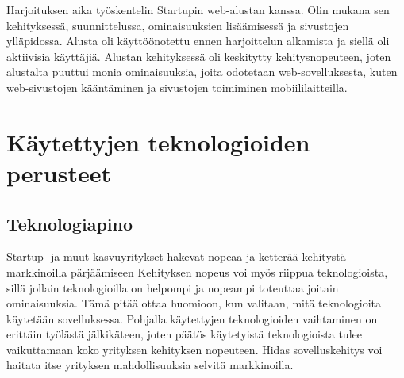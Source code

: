 \documentclass[11pt,a4paper,titlepage,oneside]{article}
\begin{document}
Harjoituksen aika työskentelin Startupin web-alustan kanssa. 
Olin mukana sen kehityksessä, suunnittelussa, ominaisuuksien lisäämisessä ja sivustojen ylläpidossa.
Alusta oli käyttöönotettu ennen harjoittelun alkamista ja siellä oli aktiivisia käyttäjiä.
Alustan kehityksessä oli keskitytty kehitysnopeuteen,
joten alustalta puuttui monia ominaisuuksia, joita odotetaan web-sovelluksesta, 
kuten web-sivustojen kääntäminen ja sivustojen toimiminen mobiililaitteilla.
\medskip

























\newpage
\section{Käytettyjen teknologioiden perusteet}                %



\subsection{Teknologiapino}



Startup- ja muut kasvuyritykset hakevat nopeaa ja ketterää kehitystä markkinoilla pärjäämiseen
Kehityksen nopeus voi myös riippua teknologioista, sillä jollain teknologioilla on helpompi ja nopeampi toteuttaa joitain ominaisuuksia.
Tämä pitää ottaa huomioon, kun valitaan, mitä teknologioita käytetään sovelluksessa.
Pohjalla käytettyjen teknologioiden vaihtaminen on erittäin työlästä jälkikäteen,
joten päätös käytetyistä teknologioista tulee vaikuttamaan koko yrityksen kehityksen nopeuteen.
Hidas sovelluskehitys voi haitata itse yrityksen mahdollisuuksia selvitä markkinoilla.
\medskip
\end{document}
